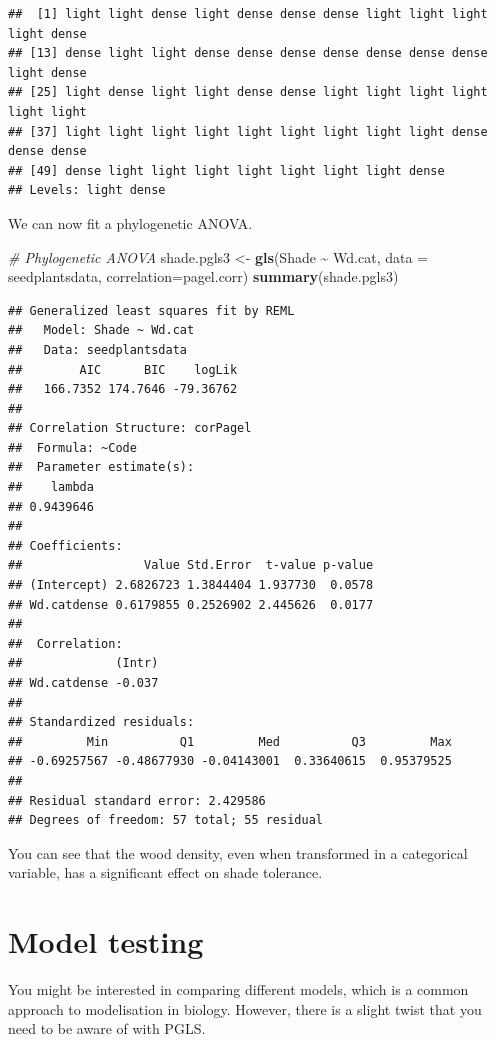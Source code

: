 \documentclass[
]{book}
\newenvironment{Shaded}{\begin{snugshade}}{\end{snugshade}}
\newcommand{\AttributeTok}[1]{\textcolor[rgb]{0.13,0.29,0.53}{#1}}
\newcommand{\CommentTok}[1]{\textcolor[rgb]{0.56,0.35,0.01}{\textit{#1}}}
\newcommand{\FunctionTok}[1]{\textcolor[rgb]{0.13,0.29,0.53}{\textbf{#1}}}
\newcommand{\NormalTok}[1]{#1}
\newcommand{\OtherTok}[1]{\textcolor[rgb]{0.56,0.35,0.01}{#1}}
\newcommand{\SpecialCharTok}[1]{\textcolor[rgb]{0.81,0.36,0.00}{\textbf{#1}}}
\begin{document}
\begin{verbatim}
##  [1] light light dense light dense dense dense light light light light dense
## [13] dense light light dense dense dense dense dense dense dense light dense
## [25] light dense light light dense dense light light light light light light
## [37] light light light light light light light light light dense dense dense
## [49] dense light light light light light light light dense
## Levels: light dense
\end{verbatim}

We can now fit a phylogenetic ANOVA.

\begin{Shaded}
\begin{Highlighting}[]
\CommentTok{\# Phylogenetic ANOVA}
\NormalTok{shade.pgls3 }\OtherTok{\textless{}{-}} \FunctionTok{gls}\NormalTok{(Shade }\SpecialCharTok{\textasciitilde{}}\NormalTok{ Wd.cat, }\AttributeTok{data =}\NormalTok{ seedplantsdata, }\AttributeTok{correlation=}\NormalTok{pagel.corr)}
\FunctionTok{summary}\NormalTok{(shade.pgls3)}
\end{Highlighting}
\end{Shaded}

\begin{verbatim}
## Generalized least squares fit by REML
##   Model: Shade ~ Wd.cat 
##   Data: seedplantsdata 
##        AIC      BIC    logLik
##   166.7352 174.7646 -79.36762
## 
## Correlation Structure: corPagel
##  Formula: ~Code 
##  Parameter estimate(s):
##    lambda 
## 0.9439646 
## 
## Coefficients:
##                 Value Std.Error  t-value p-value
## (Intercept) 2.6826723 1.3844404 1.937730  0.0578
## Wd.catdense 0.6179855 0.2526902 2.445626  0.0177
## 
##  Correlation: 
##             (Intr)
## Wd.catdense -0.037
## 
## Standardized residuals:
##         Min          Q1         Med          Q3         Max 
## -0.69257567 -0.48677930 -0.04143001  0.33640615  0.95379525 
## 
## Residual standard error: 2.429586 
## Degrees of freedom: 57 total; 55 residual
\end{verbatim}

You can see that the wood density, even when transformed in a categorical variable, has a significant effect on shade tolerance.

\chapter{Model testing}\label{model-testing}

You might be interested in comparing different models, which is a common approach to modelisation in biology. However, there is a slight twist that you need to be aware of with PGLS.
\end{document}
